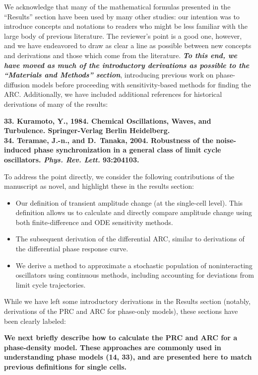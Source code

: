\documentclass[11pt, letterpaper]{article}
\newenvironment{manuscript}[1]{\begin{center}\begin{tcolorbox}[colback=green!5!white,colframe=green!75!black,width=0.8\textwidth,title={#1},breakable,fonttitle=\bfseries]}{\end{tcolorbox}\end{center}}
\begin{document}
We acknowledge that many of the mathematical formulas presented in the ``Results'' section have been used by many other studies: our intention was to introduce concepts and notations to readers who might be less familiar with the large body of previous literature.
The reviewer's point is a good one, however, and we have endeavored to draw as clear a line as possible between new concepts and derivations and those which come from the literature.
{\itshape\bfseries To this end, we have moved as much of the introductory derivations as possible to the ``Materials and Methods'' section}, introducing previous work on phase-diffusion models before proceeding with sensitivity-based methods for finding the ARC.
Additionally, we have included additional references for historical derivations of many of the results:
\begin{manuscript}{Page 21}
\bfseries
33. Kuramoto, Y., 1984. Chemical Oscillations, Waves, and Turbulence. Springer-Verlag Berlin
Heidelberg.\\
34. Teramae, J.-n., and D.~Tanaka, 2004. {Robustness of the noise-induced phase synchronization in a general
  class of limit cycle oscillators.} \emph{Phys. Rev. Lett.} 93:204103.
\end{manuscript}

To address the point directly, we consider the following contributions of the manuscript as novel, and highlight these in the results section:

\begin{itemize}
  \item Our definition of transient amplitude change (at the single-cell level). This definition allows us to calculate and directly compare amplitude change using both finite-difference and ODE sensitivity methods.
  \item The subsequent derivation of the differential ARC, similar to derivations of the differential phase response curve.
  \item We derive a method to approximate a stochastic population of noninteracting oscillators using continuous methods, including accounting for deviations from limit cycle trajectories.
\end{itemize}

While we have left some introductory derivations in the Results section (notably, derivations of the PRC and ARC for phase-only models), these sections have been clearly labeled:

\begin{manuscript}{Page 11}
\bfseries
We next briefly describe how to calculate the PRC and ARC for a phase-density model.
These approaches are commonly used in understanding phase models (14, 33), and are presented here to match previous definitions for single cells.
\end{manuscript}
\end{document}
